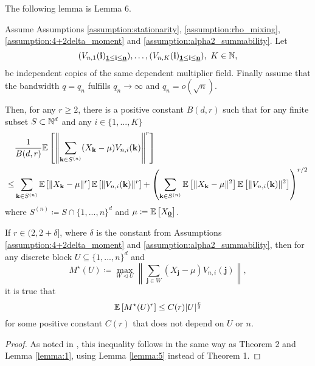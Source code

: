 The following lemma is \cite{[0]BUCCHIA2017344} Lemma 6.
\begin{lemma} \label{lemma:6}
    Assume Assumptions \ref{assumption:stationarity}, \ref{assumption:rho_mixing}, \ref{assumption:4+2delta_moment} and \ref{assumption:alpha2_summability}. Let 
    \[ (V_{n, 1}(\mathbf{i})_{\usbf[1] \leq \mathbf{i} \leq \usbf[n]}), \ldots, (V_{n, K}(\mathbf{i})_{\usbf[1] \leq \mathbf{i} \leq \usbf[n]}), \ K \in \NN, \]
    be independent copies of the same dependent multiplier field.
    Finally assume that the bandwidth $q = q_n$ fulfills $q_n \to \infty$ and $q_n = o(\sqrt{n})$.

    Then, for any $r \geq 2$, there is a positive constant $B(d, r)$ such that for any finite subset $S \subset \mathbb{N}^d$ and any $i \in \{1, ..., K\}$
    \begin{align*}
        & \frac{1}{B(d, r)} \mathbb{E}\left[\left\| \sum\limits_{\mathbf{k} \in S^{(n)}} (X_{\mathbf{k}} - \mu) V_{n, i}(\mathbf{k}) \right\|^r\right] \\ \leq &
         \sum\limits_{\mathbf{k} \in S^{(n)}} \mathbb{E}\left[\| X_{\mathbf{k}} - \mu \|^r\right] \mathbb{E}\left[\| V_{n, i}(\mathbf{k}) \|^r\right] + 
        \left( \sum\limits_{\mathbf{k} \in S^{(n)}} \mathbb{E}\left[\| X_\mathbf{k} - \mu \|^2\right] \mathbb{E}\left[\| V_{n, i}(\mathbf{k}) \|^2\right] \right)^{r/2}
    \end{align*}
    where $S^{(n)} \coloneqq S \cap \{1, ..., n\}^d$ and $\mu \coloneqq \EE{X_{\usbf[0]}}$.

    If $r \in (2, 2+\delta]$, where $\delta$ is the constant from Assumptions \ref{assumption:4+2delta_moment} and \ref{assumption:alpha2_summability}, then for any discrete block $U \subseteq \{1, ..., n\}^d$ and 
    \[ M^{\star}(U) \coloneqq \max\limits_{W \triangleleft U} \left\| \sum\limits_{\mathbf{j} \in W} (X_{\mathbf{j}} - \mu) V_{n, i}(\mathbf{j}) \right\|, \]
    it is true that
    \[ \mathbb{E}\left[M^\star(U)^r\right] \leq C(r) |U|^{\frac{r}{2}} \]
    for some positive constant $C(r)$ that does not depend on $U$ or $n$.
\end{lemma}
\begin{proof}
    As noted in \cite{[0]BUCCHIA2017344}, this inequality follows in the same way as \cite{[56]zhang1998rosenthal} Theorem 2 and Lemma \ref{lemma:1}, using Lemma \ref{lemma:5} instead of \cite{[56]zhang1998rosenthal} Theorem 1.
\end{proof}
